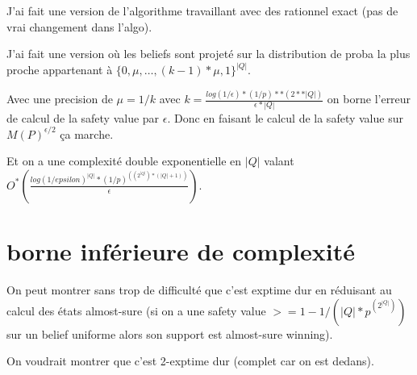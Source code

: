 \documentclass{article}
\begin{document}
    J'ai fait une version de l'algorithme travaillant avec des rationnel exact (pas de vrai changement dans l'algo). \newline

    J'ai fait une version où les beliefs sont projeté sur la distribution de proba la plus proche appartenant à $\{ 0, \mu, \dots, (k-1)*\mu, 1 \}^{|Q|}$. \newline

    Avec une precision de $\mu = 1/k$ avec $k = \frac{log(1/\epsilon)*(1/p)**(2**|Q|)}{\epsilon*|Q|}$ on borne l'erreur de calcul de la safety value par $\epsilon$.
    Donc en faisant le calcul de la safety value sur $M(P)^{\epsilon/2}$ ça marche. \newline

    Et on a une complexité double exponentielle en $|Q|$ valant $O^{*}(\frac{log(1/epsilon)^{|Q|}*(1/p)^{((2^{|Q|})*(|Q|+1))}}{\epsilon})$.

\section{borne inférieure de complexité}

    On peut montrer sans trop de difficulté que c'est exptime dur en réduisant au calcul des états almost-sure
    (si on a une safety value $>= 1-1/(|Q|*p^{(2^{|Q|})})$ sur un belief uniforme alors son support est almost-sure winning). \newline

    On voudrait montrer que c'est 2-exptime dur (complet car on est dedans).
\end{document}
